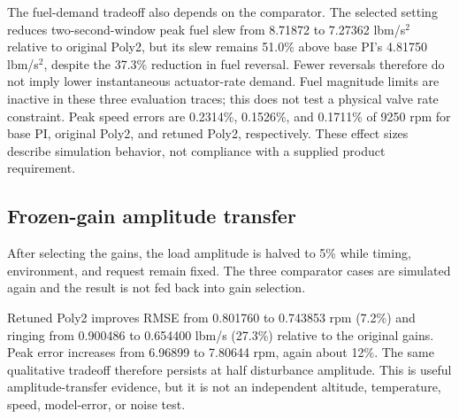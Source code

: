 The fuel-demand tradeoff also depends on the comparator. The selected setting reduces two-second-window peak fuel slew from 8.71872 to 7.27362 lbm/s$^2$ relative to original Poly2, but its slew remains 51.0\% above base PI's 4.81750 lbm/s$^2$, despite the 37.3\% reduction in fuel reversal. Fewer reversals therefore do not imply lower instantaneous actuator-rate demand. Fuel magnitude limits are inactive in these three evaluation traces; this does not test a physical valve rate constraint. Peak speed errors are 0.2314\%, 0.1526\%, and 0.1711\% of 9250 rpm for base PI, original Poly2, and retuned Poly2, respectively. These effect sizes describe simulation behavior, not compliance with a supplied product requirement.


\subsection{Frozen-gain amplitude transfer}
After selecting the gains, the load amplitude is halved to 5\% while timing, environment, and request remain fixed. The three comparator cases are simulated again and the result is not fed back into gain selection.

Retuned Poly2 improves RMSE from 0.801760 to 0.743853 rpm (7.2\%) and ringing from 0.900486 to 0.654400 lbm/s (27.3\%) relative to the original gains. Peak error increases from 6.96899 to 7.80644 rpm, again about 12\%. The same qualitative tradeoff therefore persists at half disturbance amplitude. This is useful amplitude-transfer evidence, but it is not an independent altitude, temperature, speed, model-error, or noise test.

